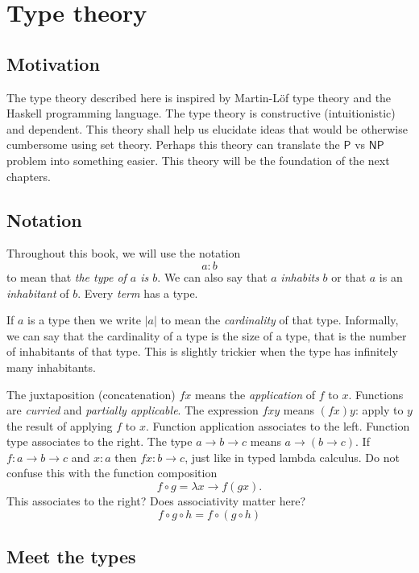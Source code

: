 \documentclass[10pt,statementpaper]{memoir}
\theoremstyle{definition}
\newcommand\PTIME{\ensuremath{\mathsf{P}}}
\newcommand\NPTIME{\ensuremath{\mathsf{NP}}}
\begin{document}
\chapter{Type theory}

\section{Motivation}

The type theory described here is inspired by
Martin-L\"of type theory
and the Haskell programming language.
The type theory is constructive (intuitionistic) and dependent.
This theory shall help us elucidate ideas that
would be otherwise cumbersome using set theory.
Perhaps this theory can translate the $\PTIME$ vs $\NPTIME$ problem
into something easier.
This theory will be the foundation
of the next chapters.

\section{Notation}

Throughout this book, we will use the notation
\[ a : b \]
to mean that \emph{the type of $a$ is $b$}.
We can also say that $a$ \emph{inhabits} $b$
or that $a$ is an \emph{inhabitant} of $b$.
Every \emph{term} has a type.

If $a$ is a type then we write $|a|$ to mean the \emph{cardinality} of that type.
Informally, we can say that the cardinality of a type
is the size of a type, that is the number of inhabitants of that type.
This is slightly trickier when the type has infinitely many inhabitants.

The juxtaposition (concatenation) $f x$ means the \emph{application} of $f$ to $x$.
Functions are \emph{curried} and \emph{partially applicable}.
The expression $f x y$ means $(f x) y$:
apply to $y$ the result of applying $f$ to $x$.
Function application associates to the left.
Function type associates to the right.
The type $a \to b \to c$ means $a \to (b \to c)$.
If $f : a \to b \to c$ and $x : a$ then $f x : b \to c$,
just like in typed lambda calculus.
Do not confuse this with the function composition
\[ f \circ g = \lambda x \to f (g x). \]
This associates to the right?
Does associativity matter here?
\[
    f \circ g \circ h = f \circ (g \circ h)
\]


\section{Meet the types}
\end{document}
